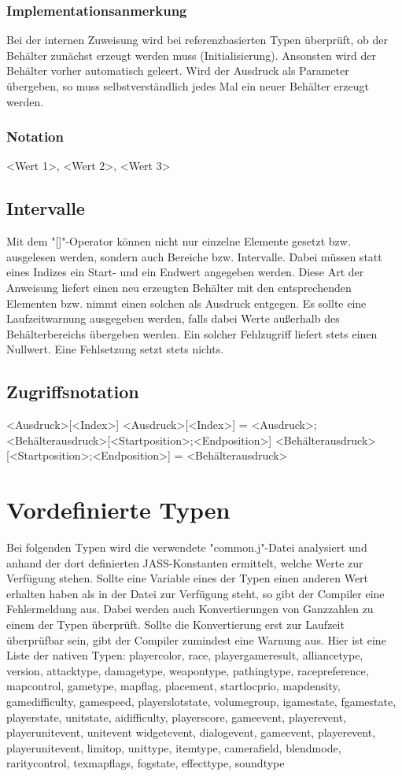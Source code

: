 \subsubsection{Implementationsanmerkung}
Bei der internen Zuweisung wird bei referenzbasierten Typen überprüft, ob der Behälter zunächst erzeugt werden muss (Initialisierung).
Ansonsten wird der Behälter vorher automatisch geleert.
Wird der Ausdruck als Parameter übergeben, so muss selbstverständlich jedes Mal ein neuer Behälter erzeugt werden.

\subsubsection{Notation}
{ <Wert 1>, <Wert 2>, <Wert 3> }


\subsection{Intervalle}
Mit dem "[]"-Operator können nicht nur einzelne Elemente gesetzt bzw. ausgelesen werden, sondern auch Bereiche bzw. Intervalle.
Dabei müssen statt eines Indizes ein Start- und ein Endwert angegeben werden. Diese Art der Anweisung liefert einen neu erzeugten
Behälter mit den entsprechenden Elementen bzw. nimmt einen solchen als Ausdruck entgegen.
Es sollte eine Laufzeitwarnung ausgegeben werden, falls dabei Werte außerhalb des Behälterbereichs übergeben werden.
Ein solcher Fehlzugriff liefert stets einen Nullwert.
Eine Fehlsetzung setzt stets nichts.

\subsection{Zugriffsnotation}
<Ausdruck>[<Index>]
<Ausdruck>[<Index>] = <Ausdruck>;
<Behälterausdruck>[<Startposition>;<Endposition>]
<Behälterausdruck>[<Startposition>;<Endposition>] = <Behälterausdruck>

\section{Vordefinierte Typen}
Bei folgenden Typen wird die verwendete "common.j"-Datei analysiert und anhand der dort definierten JASS-Konstanten
ermittelt, welche Werte zur Verfügung stehen. Sollte eine Variable eines der Typen einen anderen Wert erhalten
haben als in der Datei zur Verfügung steht, so gibt der Compiler eine Fehlermeldung aus.
Dabei werden auch Konvertierungen von Ganzzahlen zu einem der Typen überprüft. Sollte die Konvertierung erst zur
Laufzeit überprüfbar sein, gibt der Compiler zumindest eine Warnung aus.
Hier ist eine Liste der nativen Typen:
playercolor, race, playergameresult, alliancetype, version, attacktype, damagetype, weapontype, pathingtype, racepreference,
mapcontrol, gametype, mapflag, placement, startlocprio, mapdensity, gamedifficulty, gamespeed, playerslotstate, volumegroup,
igamestate, fgamestate, playerstate, unitstate, aidifficulty, playerscore, gameevent, playerevent, playerunitevent, unitevent
widgetevent, dialogevent, gameevent, playerevent, playerunitevent, limitop, unittype, itemtype, camerafield, blendmode, raritycontrol,
texmapflags, fogstate, effecttype, soundtype